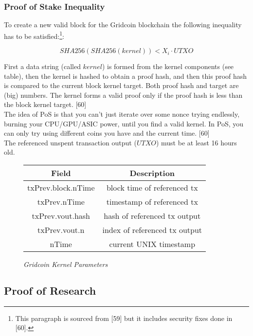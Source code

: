 \subsubsection{Proof of Stake Inequality}

To create a new valid block for the Gridcoin blockchain the following inequality has
to be satisfied:\footnote{This paragraph is sourced from [59] but it includes security fixes done in [60].}:

\begin{equation}
SHA256(SHA256(kernel)) < X_i \cdot UTXO
\end{equation}


First a data string (called $kernel$) is formed from the kernel components (see table), then the kernel is hashed to obtain a proof hash, and then this proof hash is compared to the current block kernel target. Both proof hash and target are (big) numbers. The kernel forms a valid proof only if the proof hash is less than the block kernel target. [60]\\

The idea of PoS is that you can't just iterate over some nonce trying endlessly, burning your CPU/GPU/ASIC power, until you find a valid kernel. In PoS, you can only try using different coins you have and the current time. [60]\\

The referenced unspent transaction output ($UTXO$) must be at least 16 hours old. \\

\begin{center}
\begin{figure}
 \begin{tabular}{||c c||} 
 \hline
 Field & Description \\ [0.5ex] 
 \hline
 txPrev.block.nTime & block time of referenced tx  \\
 \hline
 txPrev.nTime & timestamp of referenced tx  \\
 \hline
 txPrev.vout.hash & hash of referenced tx output  \\
 \hline
 txPrev.vout.n & index of referenced tx output  \\
 \hline
 nTime & current UNIX timestamp  \\ [1ex] 
 \hline
\end{tabular}
\medskip
\caption{\textit{Gridcoin Kernel Parameters} }
\end{figure}
\end{center}

\subsection{Proof of Research}

